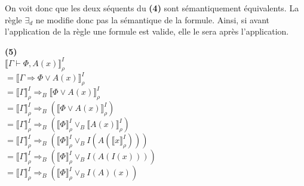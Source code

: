 \documentclass[11pt,letterpaper]{article}
\begin{document}
\vspace{10px}

On voit donc que les deux séquents du \textbf{(4)} sont sémantiquement équivalents. La règle $\exists_{d}$ ne modifie donc pas la sémantique de la formule. Ainsi, si avant l'application de la règle une formule est valide, elle le sera après l'application. \\

\vspace{10px}

\textbf{(5)}\\
$\llbracket \Gamma \vdash \Phi, A(x) \rrbracket^{I}_ {\rho}$\\
$= \llbracket \Gamma \Rightarrow \Phi \lor A(x) \rrbracket^{I}_ {\rho}$\\
$= \llbracket \Gamma \rrbracket^{I}_ {\rho} \Rightarrow_{B} \llbracket\Phi \lor A(x) \rrbracket^{I}_ {\rho}$\\
$= \llbracket \Gamma \rrbracket^{I}_ {\rho} \Rightarrow_{B} (\llbracket\Phi \lor A(x) \rrbracket^{I}_ {\rho})$\\
$= \llbracket \Gamma \rrbracket^{I}_ {\rho} \Rightarrow_{B} (\llbracket\Phi \rrbracket^{I}_ {\rho} \lor_{B} \llbracket A(x) \rrbracket^{I}_ {\rho})$\\
$= \llbracket \Gamma \rrbracket^{I}_ {\rho} \Rightarrow_{B} (\llbracket\Phi \rrbracket^{I}_ {\rho} \lor_{B} I(A(\llbracket x \rrbracket^{I}_ {\rho})))$\\
$= \llbracket \Gamma \rrbracket^{I}_ {\rho} \Rightarrow_{B} (\llbracket\Phi \rrbracket^{I}_ {\rho} \lor_{B} I(A(I(x))))$\\
$= \llbracket \Gamma \rrbracket^{I}_ {\rho} \Rightarrow_{B} (\llbracket\Phi \rrbracket^{I}_ {\rho} \lor_{B} I(A)(x))$\\
\vspace{10px}
\end{document}
